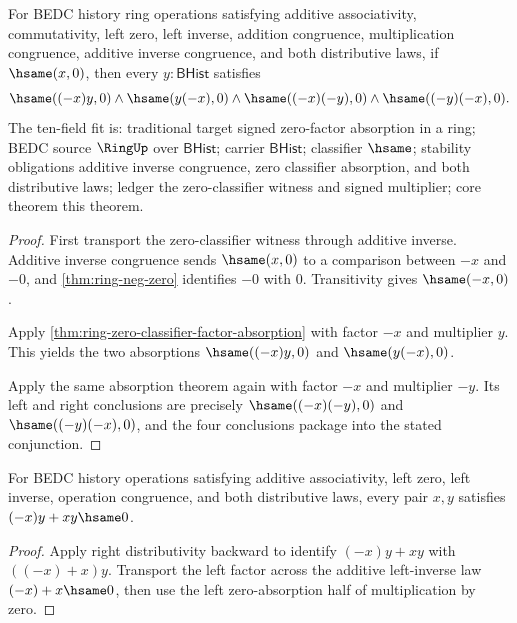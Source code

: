 \begin{theorem}
\label{thm:ring-zero-classifier-signed-factor-absorption}
For BEDC history ring operations satisfying additive associativity,
commutativity, left zero, left inverse, addition congruence, multiplication
congruence, additive inverse congruence, and both distributive laws, if
$\hsame(x,0)$, then every $y:\mathsf{BHist}$ satisfies
$$
\hsame((-x)y,0)\land \hsame(y(-x),0)\land
\hsame((-x)(-y),0)\land \hsame((-y)(-x),0).
$$
The ten-field fit is: traditional target signed zero-factor absorption in a
ring; BEDC source $\RingUp$ over $\mathsf{BHist}$; carrier $\mathsf{BHist}$;
classifier $\hsame$; stability obligations additive inverse congruence, zero
classifier absorption, and both distributive laws; ledger the zero-classifier
witness and signed multiplier; core theorem this theorem.
\end{theorem}
\begin{proof}
First transport the zero-classifier witness through additive inverse. Additive
inverse congruence sends $\hsame(x,0)$ to a comparison between $-x$ and $-0$,
and \autoref{thm:ring-neg-zero} identifies $-0$ with $0$. Transitivity gives
$\hsame(-x,0)$.

Apply \autoref{thm:ring-zero-classifier-factor-absorption} with factor $-x$ and
multiplier $y$. This yields the two absorptions $\hsame((-x)y,0)$ and
$\hsame(y(-x),0)$.

Apply the same absorption theorem again with factor $-x$ and multiplier $-y$.
Its left and right conclusions are precisely $\hsame((-x)(-y),0)$ and
$\hsame((-y)(-x),0)$, and the four conclusions package into the stated
conjunction.
\end{proof}

\begin{theorem}
\label{thm:ring-mul-neg-left-inverse-sum-zero}
For BEDC history operations satisfying additive associativity, left zero,
left inverse, operation congruence, and both distributive laws, every pair
$x,y$ satisfies $(-x)y+xy\hsame0$.
\end{theorem}
\begin{proof}
Apply right distributivity backward to identify $(-x)y+xy$ with
$((-x)+x)y$. Transport the left factor across the additive left-inverse law
$(-x)+x\hsame0$, then use the left zero-absorption half of multiplication by
zero.
\end{proof}

